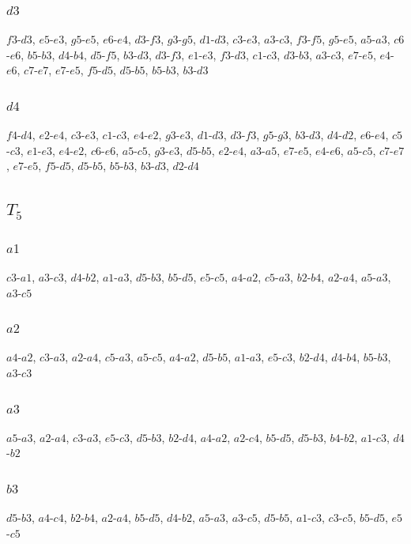 \documentclass{article}
\begin{document}
\subsubsection{\large $d3$}
$f3$-$d3$, $e5$-$e3$, $g5$-$e5$, $e6$-$e4$, $d3$-$f3$, $g3$-$g5$, $d1$-$d3$, $c3$-$e3$, $a3$-$c3$, $f3$-$f5$, $g5$-$e5$, $a5$-$a3$, $c6$-$e6$, $b5$-$b3$, $d4$-$b4$, $d5$-$f5$, $b3$-$d3$, $d3$-$f3$, $e1$-$e3$, $f3$-$d3$, $c1$-$c3$, $d3$-$b3$, $a3$-$c3$, $e7$-$e5$, $e4$-$e6$, $c7$-$e7$, $e7$-$e5$, $f5$-$d5$, $d5$-$b5$, $b5$-$b3$, $b3$-$d3$

\subsubsection{\large $d4$}
$f4$-$d4$, $e2$-$e4$, $c3$-$e3$, $c1$-$c3$, $e4$-$e2$, $g3$-$e3$, $d1$-$d3$, $d3$-$f3$, $g5$-$g3$, $b3$-$d3$, $d4$-$d2$, $e6$-$e4$, $c5$-$c3$, $e1$-$e3$, $e4$-$e2$, $c6$-$e6$, $a5$-$c5$, $g3$-$e3$, $d5$-$b5$, $e2$-$e4$, $a3$-$a5$, $e7$-$e5$, $e4$-$e6$, $a5$-$c5$, $c7$-$e7$, $e7$-$e5$, $f5$-$d5$, $d5$-$b5$, $b5$-$b3$, $b3$-$d3$, $d2$-$d4$

\subsection{$T_5$}
\subsubsection{\large $a1$}
$c3$-$a1$, $a3$-$c3$, $d4$-$b2$, $a1$-$a3$, $d5$-$b3$, $b5$-$d5$, $e5$-$c5$, $a4$-$a2$, $c5$-$a3$, $b2$-$b4$, $a2$-$a4$, $a5$-$a3$, $a3$-$c5$

\subsubsection{\large $a2$}
$a4$-$a2$, $c3$-$a3$, $a2$-$a4$, $c5$-$a3$, $a5$-$c5$, $a4$-$a2$, $d5$-$b5$, $a1$-$a3$, $e5$-$c3$, $b2$-$d4$, $d4$-$b4$, $b5$-$b3$, $a3$-$c3$

\subsubsection{\large $a3$}
$a5$-$a3$, $a2$-$a4$, $c3$-$a3$, $e5$-$c3$, $d5$-$b3$, $b2$-$d4$, $a4$-$a2$, $a2$-$c4$, $b5$-$d5$, $d5$-$b3$, $b4$-$b2$, $a1$-$c3$, $d4$-$b2$

\subsubsection{\large $b3$}
$d5$-$b3$, $a4$-$c4$, $b2$-$b4$, $a2$-$a4$, $b5$-$d5$, $d4$-$b2$, $a5$-$a3$, $a3$-$c5$, $d5$-$b5$, $a1$-$c3$, $c3$-$c5$, $b5$-$d5$, $e5$-$c5$
\end{document}
